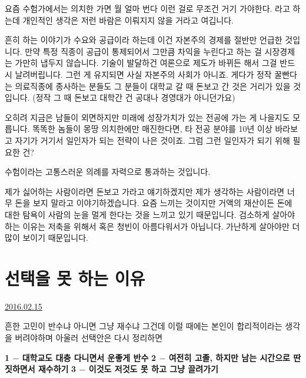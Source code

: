 요즘 수험가에서는 의치한 가면 월 얼마 번다 이런 걸로 무조건 거기 가야한다.
라고 하는데 개인적인 생각은 저런 바람은 이뤄지지 않을 거라고 여깁니다.
\vspace{5mm}

흔히 하는 이야기가 수요와 공급이라 하는데 이건 자본주의 경제를 절반만 언급한 것입니다.
만약 특정 직종이 공급이 통제되어서 그만큼 차익을 누린다고 하는 걸 시장경제는 가만히 냅두지 않습니다.
기술이 발달하건 여론으로 제도가 바뀌든 해서 그걸 반드시 날려버립니다. 그런 게 유지되면 사실 자본주의 사회가 아니죠.
게다가 정작 꿀빤다는 의료직종에 종사하는 분들도 그 분들이 대학교 갈 때 돈보고 간 것은 거리가 있을 것입니다.
(정작 그 때 돈보고 대학간 건 공대나 경영대가 아니던가요)
\vspace{5mm}

오히려 지금은 남들이 외면하지만 미래에 성장가치가 있는 전공에 가는 게 나을지도 모릅니다.
똑똑한 놈들이 몽땅 의치한에만 매진한다면, 타 전공 분야를 10년 이상 바라보고 자기가 거기서 일인자가 되는 전략이 나은 것이죠.
그럼 그런 일인자가 되기 위해 필요한 건?
\vspace{5mm}

수험이라는 고통스러운 의례를 자력으로 통과하는 것입니다.
\vspace{5mm}

제가 싫어하는 사람이라면 돈보고 가라고 얘기하겠지만
제가 생각하는 사람이라면 너무 돈을 보지 말라고 이야기하겠습니다.
요즘 느끼는 것이지만 거액의 재산이든 돈에 대한 탐욕이 사람의 눈을 멀게 한다는 것을 느끼고 있기 때문입니다.
검소하게 살아야하는 이유는 저축을 위해서 혹은 청빈이 아름다워서가 아닙니다.
가난하게 살아야만 더 많이 보이기 때문입니다.
\vspace{5mm}









\section{선택을 못 하는 이유}
\href{https://www.kockoc.com/Apoc/636857}{2016.02.15}

\vspace{5mm}

흔한 고민이 반수냐 아니면 그냥 재수냐 그건데
이럴 때에는 본인이 합리적이라는 생각을 버려야하며
아울러 선택안은 다시 정리하면
\vspace{5mm}

\textbf{1 $-$ 대학교도 대충 다니면서 운좋게 반수}
\textbf{2 $-$ 여전히 고졸, 하지만 남는 시간으로 딴짓하면서 재수하기}
\textbf{3 $-$ 이것도 저것도 못 하고 그냥 끌려가기}
\vspace{5mm}

